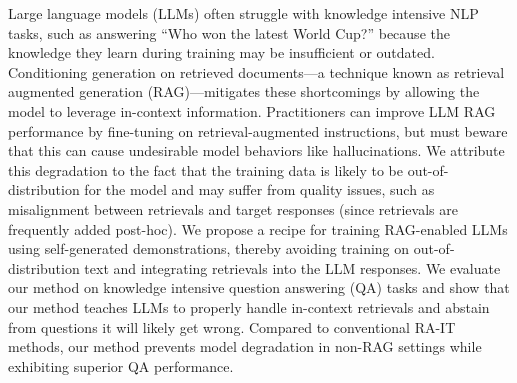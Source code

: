 Large language models (LLMs) often struggle with knowledge intensive NLP tasks,
such as answering ``Who won the latest World Cup?''
because the knowledge they learn during training may be insufficient or outdated.
Conditioning generation on retrieved documents---a technique known as retrieval augmented generation (RAG)---mitigates these shortcomings by allowing the model to leverage in-context information.
Practitioners can improve LLM RAG performance 
by fine-tuning on retrieval-augmented instructions, 
but must beware that this can cause undesirable model behaviors like hallucinations. 
We attribute this degradation to the fact that the training data is likely to be out-of-distribution for the model and may suffer from quality issues, 
such as misalignment between retrievals and target responses  
(since retrievals are frequently added post-hoc).
We propose a recipe for training RAG-enabled LLMs
using self-generated demonstrations,
thereby avoiding training on out-of-distribution text and integrating retrievals into the LLM responses.
We evaluate our method on knowledge intensive question answering (QA) tasks and show that
our method teaches LLMs to properly handle in-context retrievals and abstain from questions it will likely get wrong.
Compared to conventional RA-IT methods, our method prevents model degradation in non-RAG settings while exhibiting superior QA performance.
